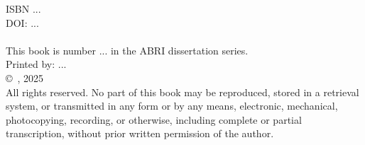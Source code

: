 \thispagestyle{empty}
\vspace*{\fill}
\begin{flushleft}
ISBN ...\\[1em]

DOI: ...\texttt{}\\[1em]

\textit{ \BookTitle }\\[1em]

This book is number ... in the ABRI dissertation series.\\[1em]

Printed by: ...\\[1em]

\copyright\ \BookAuthor, 2025 \\
All rights reserved. No part of this book may be reproduced, stored in a retrieval system, or transmitted in any form or by any means, electronic, mechanical, photocopying, recording, or otherwise, including complete or partial transcription, without prior written permission of the author.
\end{flushleft}

\clearpage
